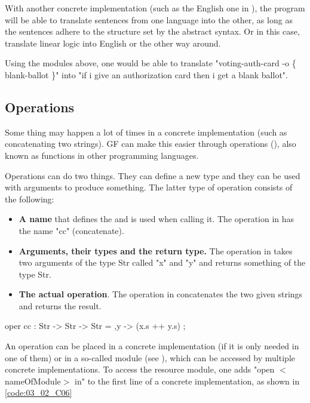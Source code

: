 With another concrete implementation (such as the English one in ), the program will be able to translate sentences from one language into the other, as long as the sentences adhere to the structure set by the abstract syntax. Or in this case, translate linear logic into English or the other way around.

Using the modules above, one would be able to translate "voting-auth-card -o \{ blank-ballot \}" into "if i give an authorization card then i get a blank ballot".

\subsection{Operations}
\label{03_02_03}

Some thing may happen a lot of times in a concrete implementation (such as concatenating two strings). GF can make this easier through operations (), also known as functions in other programming languages. 

Operations can do two things. They can define a new type and they can be used with arguments to produce something. The latter type of operation consists of the following:
\begin{itemize}
\item \textbf{A name} that defines the  and is used when calling it. The operation in  has the name "cc" (concatenate).

\item \textbf{Arguments, their types and the return type.} The operation in  takes two arguments of the type Str called "x" and "y" and returns something of the type Str.

\item \textbf{The actual operation}. The operation in  concatenates the two given strings and returns the result.
\end{itemize}

\begin{lstgf}
oper 
    cc : Str -> Str -> Str = \x,y -> (x.s ++ y.s) ;
\end{lstgf}

An operation can be placed in a concrete implementation (if it is only needed in one of them) or in a so-called  module (see ), which can be accessed by multiple concrete implementations. To access the resource module, one adds "open $<$nameOfModule$>$ in" to the first line of a concrete implementation, as shown in \ref{code:03_02_C06}

